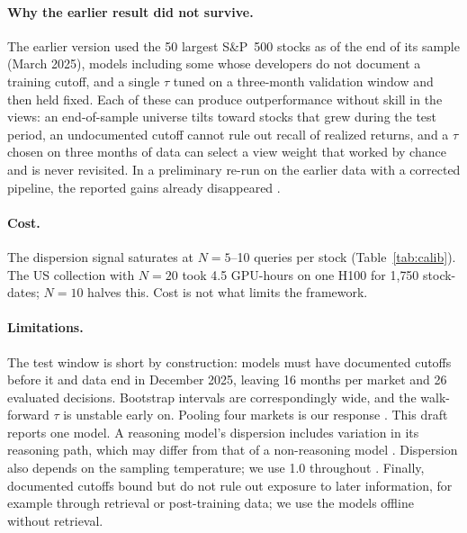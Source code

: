 \paragraph{Why the earlier result did not survive.}
The earlier version used the 50 largest S\&P~500 stocks as of the end of its sample (March 2025), models including some whose developers do not document a training cutoff, and a single $\tau$ tuned on a three-month validation window and then held fixed. Each of these can produce outperformance without skill in the views: an end-of-sample universe tilts toward stocks that grew during the test period, an undocumented cutoff cannot rule out recall of realized returns, and a $\tau$ chosen on three months of data can select a view weight that worked by chance and is never revisited. In a preliminary re-run on the earlier data with a corrected pipeline, the reported gains already disappeared . 

\paragraph{Cost.}
The dispersion signal saturates at $N=5$--10 queries per stock (Table~\ref{tab:calib}). The US collection with $N=20$ took 4.5 GPU-hours on one H100 for 1{,}750 stock-dates; $N=10$ halves this. Cost is not what limits the framework.

\paragraph{Limitations.}
The test window is short by construction: models must have documented cutoffs before it and data end in December 2025, leaving 16 months per market and 26 evaluated decisions. Bootstrap intervals are correspondingly wide, and the walk-forward $\tau$ is unstable early on. Pooling four markets is our response . This draft reports one model. A reasoning model's dispersion includes variation in its reasoning path, which may differ from that of a non-reasoning model . Dispersion also depends on the sampling temperature; we use 1.0 throughout . Finally, documented cutoffs bound but do not rule out exposure to later information, for example through retrieval or post-training data; we use the models offline without retrieval.
